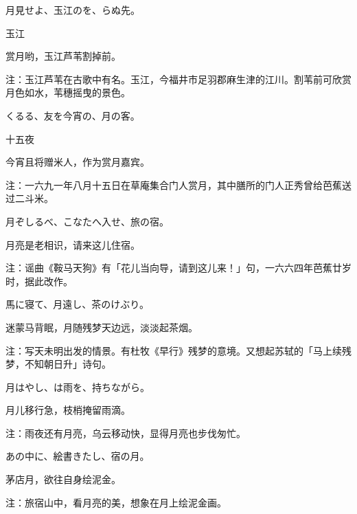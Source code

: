 \begin{haiku}
    {\FH 月見せよ、玉江のを、らぬ先。}

    {\FK 玉江}

    {\FK 赏月哟，玉江芦苇割掉前。}

    {\FT 注：玉江芦苇在古歌中有名。玉江，今福井市足羽郡麻生津的江川。割苇前可欣赏月色如水，苇穗摇曳的景色。}
\end{haiku}

\begin{haiku}
    {\FH {}くるる、友を今宵の、月の客。}

    {\FK 十五夜}

    {\FK 今宵且将赠米人，作为赏月嘉宾。}

    {\FT 注：一六九一年八月十五日在草庵集合门人赏月，其中膳所的门人正秀曾给芭蕉送过二斗米。}
\end{haiku}

\begin{haiku}
    {\FH 月ぞしるべ、こなたへ入せ、旅の宿。}

    {\FK 月亮是老相识，请来这儿住宿。}

    {\FT 注：谣曲《鞍马天狗》有「花儿当向导，请到这儿来！」句，一六六四年芭蕉廿岁时，据此改作。}
\end{haiku}

\begin{haiku}
    {\FH 馬に寝て、月遠し、茶のけぶり。}

    {\FK 迷蒙马背眠，月随残梦天边远，淡淡起茶烟。}

    {\FT 注：写天未明出发的情景。有杜牧《早行》残梦的意境。又想起苏轼的「马上续残梦，不知朝日升」诗句。}
\end{haiku}

\begin{haiku}
    {\FH 月はやし、は雨を、持ちながら。}

    {\FK 月儿移行急，枝梢掩留雨滴。}

    {\FT 注：雨夜还有月亮，乌云移动快，显得月亮也步伐匆忙。}
\end{haiku}

\begin{haiku}
    {\FH あの中に、絵書きたし、宿の月。}

    {\FK 茅店月，欲往自身绘泥金。}

    {\FT 注：旅宿山中，看月亮的美，想象在月上绘泥金画。}
\end{haiku}

